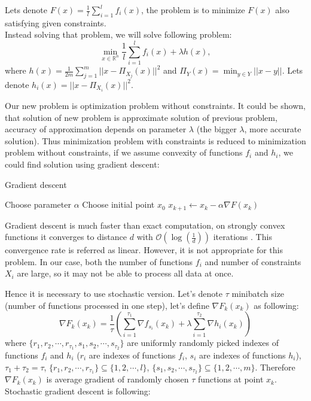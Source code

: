 \documentclass[11pt]{book}
\newcommand{\R}{\mathbb{R}}
\begin{document}
Lets denote $F(x)=\frac{1}{l}\sum_{i=1}^l f_i(x)$, the problem is to minimize $F(x)$ also satisfying given constraints.\\

Instead solving that problem, we will solve following problem: \label{solvedProblem}
$$ \min_{x \in \R^n} \frac{1}{l}\sum_{i=1}^l f_i(x) + \lambda h(x),$$
where $h(x)=\frac{1}{2m}\sum_{j=1}^m ||x-\Pi_{X_j}(x)||^2$ and $\Pi_Y(x) = \min_{y \in Y} ||x-y||$. Lets denote $h_i(x)=||x-\Pi_{X_i}(x)||^2.$

Our new problem is optimization problem without constraints. %
It could be shown, that solution of new problem is approximate solution of previous problem, accuracy of approximation depends on parameter $\lambda$ (the bigger $\lambda$, more accurate solution). Thus minimization problem with constraints is reduced to minimization problem without constraints, if we assume convexity of functions $f_i$ and $h_i$, we could find solution using gradient descent:\\

\begin{algorithm}[H]
	\caption{Gradient descent}
	\label{alg:gd}
	\begin{algorithmic}[1]
		\State Choose parameter $\alpha$
		\State Choose initial point $x_0$
		\State $x_{k+1} \leftarrow x_k - \alpha\nabla F(x_k) $
		\EndFor
	\end{algorithmic}
\end{algorithm}

Gradient descent is much faster than exact computation, on strongly convex functions it converges to distance $d$ with $\mathcal{O}(\log(\frac{1}{d}))$ iterations \cite{GD} . This convergence rate is referred as linear. However, it is not appropriate for this problem. In our case, both the number of functions $f_i$ and number of constraints $X_i$ are large, so it may not be able to process all data at once.

Hence it is necessary to use stochastic version. Let's denote $\tau$ minibatch size (number of functions processed in one step), let's define $\nabla F_k(x_k)$ as following: $$\nabla F_k(x_k) = \frac{1}{\tau}\left(\sum_{i=1}^{\tau_1} \nabla f_{s_i}(x_k) + \lambda \sum_{i=1}^{\tau_2} \nabla h_i(x_k) \right)$$ where $\{r_1, r_2, \cdots, r_{\tau_1}, s_1, s_2, \cdots, s_{\tau_2} \}$ are uniformly randomly picked indexes of functions $f_i$ and $h_i$ ($r_i$ are indexes of functions $f_i$, $s_i$ are indexes of functions $h_i$), $\tau_1+\tau_2=\tau$, $\{r_1, r_2, \cdots, r_{\tau_1} \} \subseteq \{1,2,\cdots, l \}$, $\{s_1, s_2, \cdots, s_{\tau_2} \} \subseteq \{1,2,\cdots, m \}$. Therefore $\nabla F_k(x_k)$ is average gradient of randomly chosen $\tau$ functions at point $x_k$. Stochastic gradient descent is following:
\end{document}
